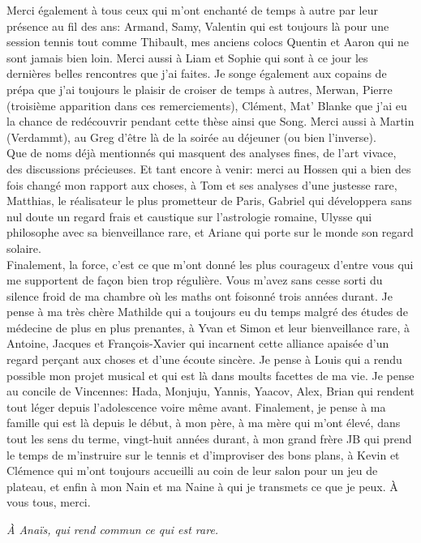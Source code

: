 Merci également à tous ceux qui m'ont enchanté de temps à autre par leur présence au fil des ans: Armand, Samy, Valentin qui est toujours là pour une session tennis tout comme Thibault, mes anciens colocs Quentin et Aaron qui ne sont jamais bien loin. Merci aussi à Liam et Sophie qui sont à ce jour les dernières belles rencontres que j'ai faites.
Je songe également aux copains de prépa que j'ai toujours le plaisir de croiser de temps à autres, Merwan, Pierre (troisième apparition dans ces remerciements), Clément, Mat' Blanke que j'ai eu la chance de redécouvrir pendant cette thèse ainsi que Song. Merci aussi à Martin (Verdammt), au Greg d'être là de la soirée au déjeuner (ou bien l'inverse).\\  
Que de noms déjà mentionnés qui masquent des analyses fines, de l'art vivace, des discussions précieuses. Et tant encore à venir: merci au Hossen qui a bien des fois changé mon rapport aux choses, à Tom et ses analyses d'une justesse rare, Matthias, le réalisateur le plus prometteur de Paris, Gabriel qui développera sans nul doute un regard frais et caustique sur l'astrologie romaine, Ulysse qui philosophe avec sa bienveillance rare, et Ariane qui porte sur le monde son regard solaire.\\
Finalement, la force, c'est ce que m'ont donné les plus courageux d'entre vous qui me supportent de façon bien trop régulière. Vous m'avez sans cesse sorti du silence froid de ma chambre où les maths ont foisonné trois années durant. Je pense à ma très chère Mathilde qui a toujours eu du temps malgré des études de médecine de plus en plus prenantes, à Yvan et Simon et leur bienveillance rare, à Antoine, Jacques et François-Xavier qui incarnent cette alliance apaisée d'un regard perçant aux choses et d'une écoute sincère. Je pense à Louis qui a rendu possible mon projet musical et qui est là dans moults facettes de ma vie. Je pense au concile de Vincennes: Hada, Monjuju, Yannis, Yaacov, Alex, Brian qui rendent tout léger depuis l'adolescence voire même avant. Finalement, je pense à ma famille qui est là depuis le début, à mon père, à ma mère qui m'ont élevé, dans tout les sens du terme, vingt-huit années durant, à mon grand frère JB qui prend le temps de m'instruire sur le tennis et d'improviser des bons plans, à Kevin et Clémence qui m'ont toujours accueilli au coin de leur salon pour un jeu de plateau, et enfin à mon Nain et ma Naine à qui je transmets ce que je peux. À vous tous, merci.

\newpage
\textit{À Anaïs, qui rend commun ce qui est rare.}